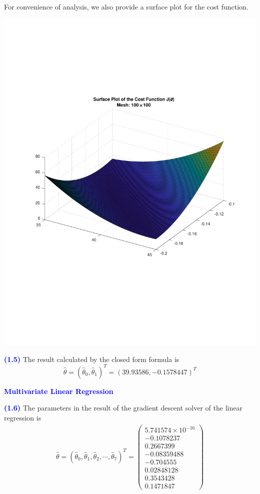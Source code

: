 \documentclass[a4paper,12pt]{article}
\newcommand{\qnum}[1]{\noindent\textcolor{blue}{\textbf{(#1)}}}
\newcommand{\ba}{\[\begin{aligned}}
\newcommand{\ea}{\end{aligned}\]}
\begin{document}
For convenience of analysis, we also provide a surface plot for the cost function.
\begin{center}
    \includegraphics[width=0.9\linewidth, trim={0 6.5cm 0 6cm}]{Images/Prob1-4-Surf.pdf}
\end{center}
\bigskip



\qnum{1.5}
The result calculated by the closed form formula is
\[
    \hat\theta = (\hat\theta_0, \hat\theta_1)^T
    = (39.93586, -0.1578447)^T
\]
\bigskip


\noindent\textcolor{blue}{\textbf{Multivariate Linear Regression}}\bigskip  

\qnum{1.6}
The parameters in the result of the gradient descent solver of the linear regression is 
\ba 
    \hat\theta = (\hat\theta_0, \hat\theta_1, \hat\theta_2, \cdots, \hat\theta_7)^T
    = \begin{pmatrix}
    5.741574\times 10^{-16} \\
    -0.1078237 \\ 
    0.2667399 \\ 
    -0.08359488 \\ 
    -0.704555 \\ 
    0.02848128 \\ 
    0.3543428 \\ 
    0.1471847
    \end{pmatrix}
\ea 
\end{document}
